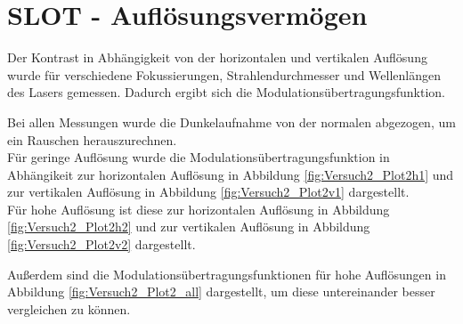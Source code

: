 



\section{SLOT - Auflösungsvermögen}

Der Kontrast in Abhängigkeit von der horizontalen und vertikalen Auflösung wurde für verschiedene Fokussierungen, Strahlendurchmesser und Wellenlängen des Lasers gemessen. Dadurch ergibt sich die Modulationsübertragungsfunktion.
 
Bei allen Messungen wurde die Dunkelaufnahme von der normalen abgezogen, um ein Rauschen herauszurechnen.\\

Für geringe Auflösung wurde die Modulationsübertragungsfunktion  in Abhängikeit zur horizontalen Auflösung in Abbildung \ref{fig:Versuch2_Plot2h1} und zur vertikalen Auflösung in Abbildung \ref{fig:Versuch2_Plot2v1} dargestellt.\\
Für hohe Auflösung ist diese zur horizontalen Auflösung in Abbildung \ref{fig:Versuch2_Plot2h2} und zur vertikalen Auflösung in Abbildung \ref{fig:Versuch2_Plot2v2} dargestellt.

Außerdem sind die Modulationsübertragungsfunktionen für hohe Auflösungen in Abbildung \ref{fig:Versuch2_Plot2_all} dargestellt, um diese untereinander besser vergleichen zu können.



